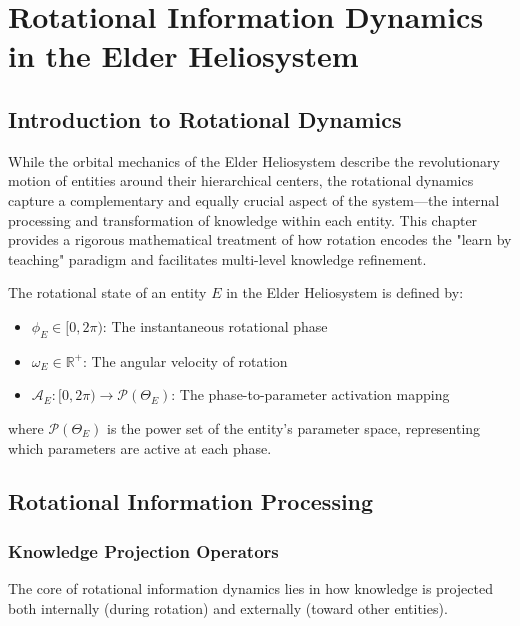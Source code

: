 \chapter{Rotational Information Dynamics in the Elder Heliosystem}

\section{Introduction to Rotational Dynamics}

While the orbital mechanics of the Elder Heliosystem describe the revolutionary motion of entities around their hierarchical centers, the rotational dynamics capture a complementary and equally crucial aspect of the system—the internal processing and transformation of knowledge within each entity. This chapter provides a rigorous mathematical treatment of how rotation encodes the "learn by teaching" paradigm and facilitates multi-level knowledge refinement.

\begin{definition}
The rotational state of an entity $E$ in the Elder Heliosystem is defined by:
\begin{itemize}
    \item $\phi_E \in [0, 2\pi)$: The instantaneous rotational phase
    \item $\omega_E \in \mathbb{R}^+$: The angular velocity of rotation
    \item $\mathcal{A}_E: [0, 2\pi) \rightarrow \mathcal{P}(\Theta_E)$: The phase-to-parameter activation mapping
\end{itemize}
where $\mathcal{P}(\Theta_E)$ is the power set of the entity's parameter space, representing which parameters are active at each phase.
\end{definition}

\section{Rotational Information Processing}

\subsection{Knowledge Projection Operators}

The core of rotational information dynamics lies in how knowledge is projected both internally (during rotation) and externally (toward other entities).

